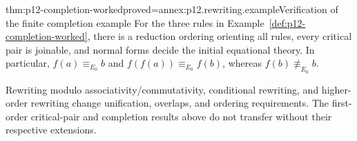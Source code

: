 \begin{hbtheorem}{thm:p12-completion-worked}{proved=annex:p12.rewriting.example}{Verification of the finite completion example}
For the three rules in Example~\ref{def:p12-completion-worked}, there
is a reduction ordering orienting all rules, every critical pair is
joinable, and normal forms decide the initial equational theory.
In particular, \(f(a)\equiv_{E_0}b\) and
\(f(f(a))\equiv_{E_0}f(b)\), whereas
\(f(b)\not\equiv_{E_0}b\).
\end{hbtheorem}



Rewriting modulo associativity/commutativity, conditional rewriting, and
higher-order rewriting change unification, overlaps, and ordering requirements.
The first-order critical-pair and completion results above do not transfer
without their respective extensions.


